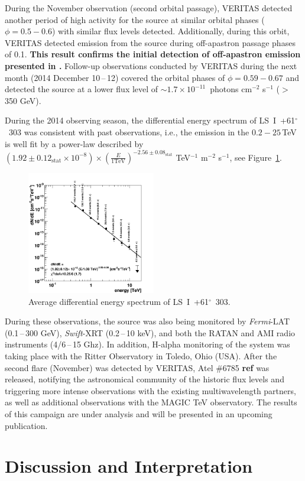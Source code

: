 \documentclass[preprint2]{aastex}
\newcommand{\pflux}{~photons cm$^{-2}$ s$^{-1}$}
\newcommand{\lsi}{LS~I~+61$^{\circ}$~303}
\newcommand{\tev}{\,TeV}
\begin{document}
During the November observation (second orbital passage), VERITAS detected another period of high activity for the source at similar orbital phases ($\phi = 0.5-0.6$) with similar flux levels detected. Additionally, during this orbit, VERITAS detected emission from the source during off-apastron passage phases of 0.1. \textbf{This result confirms the initial detection of off-apastron emission presented in \citep{2011ApJ...738....3A}.} Follow-up observations conducted by VERITAS during the next month (2014 December 10\,--\,12) covered the orbital phases of $\phi=0.59-0.67$ and detected the source at a lower flux level of $\sim1.7\times10^{-11}$\pflux{} ($>$350 GeV).

During the 2014 observing season, the differential energy spectrum of \lsi{} was consistent with past observations, i.e., the emission in the $0.2-25$\tev{} is well fit by a power-law described by $\left( 1.92 \pm 0.12_{\mathrm{stat}} \times 10^{-8} \right) \times \left( \frac{E}{\mathrm{1 TeV}} \right)^{-2.56 \pm 0.08_{\mathrm{stat}}}$ TeV$^{-1}$ m$^{-2}$ s$^{-1}$, see Figure~\ref{spec}.

\begin{figure}
\centering
\includegraphics[width=0.5\textwidth]{figs/LSI-mod-replot-spec.png}
\caption{Average differential energy spectrum of \lsi{}.}
\label{spec}
\end{figure}

During these observations, the source was also being monitored by \emph{Fermi}-LAT (0.1\,--\,300 GeV), \emph{Swift}-XRT (0.2\,--\,10 keV), and both the RATAN and AMI radio instruments (4/6\,--\,15 Ghz). In addition, H-alpha monitoring of the system was taking place with the Ritter Observatory in Toledo, Ohio (USA). After the second flare (November) was detected by VERITAS, Atel $\#$6785 \textbf{ref} was released, notifying the astronomical community of the historic flux levels and triggering more intense observations with the existing multiwavelength partners, as well as additional observations with the MAGIC TeV observatory. The results of this campaign are under analysis and will be presented in an upcoming publication. 

\section{Discussion and Interpretation}





\end{document}
